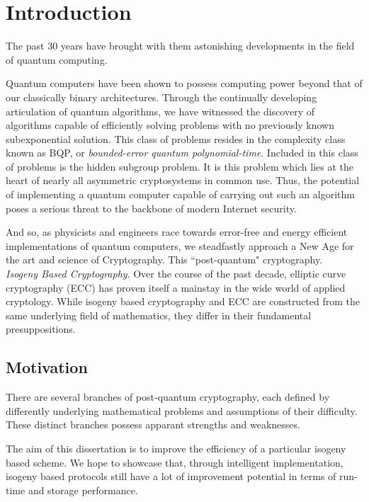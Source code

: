 \chapter{Introduction}

The past 30 years have brought with them astonishing developments in the field of quantum computing.

Quantum computers have been shown to possess computing power beyond that of our classically binary architectures. Through the continually developing articulation of quantum algorithms, we have witnessed the discovery of algorithms capable of efficiently solving problems with no previously known subexponential solution. This class of problems resides in the complexity class known as BQP, or \textit{bounded-error quantum polynomial-time}. Included in this class of problems is the hidden subgroup problem. It is this problem which lies at the heart of nearly all asymmetric cryptosystems in common use. Thus, the potential of implementing a quantum computer capable of carrying out such an algorithm poses a serious threat to the backbone of modern Internet security.  

And so, as physicists and engineers race towards error-free and energy efficient implementations of quantum computers, we steadfastly approach a New Age for the art and science of Cryptography. This ``post-quantum" cryptography.\\

\noindent
\textit{Isogeny Based Cryptography}. Over the course of the past decade, elliptic curve cryptography (ECC) has proven itself a mainstay in the wide world of applied cryptology. While isogeny based cryptography and ECC are constructed from the same underlying field of mathematics, they differ in their fundamental presuppositions.


\section{Motivation}
\label{sec:motivation}

There are several branches of post-quantum cryptography, each defined by differently underlying mathematical problems and assumptions of their difficulty. These distinct branches possess apparant strengths and weaknesses. 

The aim of this dissertation is to improve the efficiency of a particular isogeny based scheme. We hope to showcase that, through intelligent implementation, isogeny based protocols still have a lot of improvement potential in terms of run-time and storage performance. 

